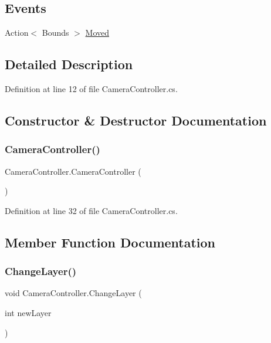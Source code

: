 \subsection*{Events}
\begin{DoxyCompactItemize}
\item 
Action$<$ Bounds $>$ \hyperlink{class_camera_controller_a660773a1d2a570dec85afc8f105bd523}{Moved}
\end{DoxyCompactItemize}


\subsection{Detailed Description}


Definition at line 12 of file Camera\+Controller.\+cs.



\subsection{Constructor \& Destructor Documentation}
\mbox{\label{class_camera_controller_a2028264f95bb29ae3a0fbd3255e3c401}} 
\subsubsection{\texorpdfstring{Camera\+Controller()}{CameraController()}}
{\footnotesize\ttfamily Camera\+Controller.\+Camera\+Controller (\begin{DoxyParamCaption}{ }\end{DoxyParamCaption})}



Definition at line 32 of file Camera\+Controller.\+cs.



\subsection{Member Function Documentation}
\mbox{\label{class_camera_controller_a490a2f66c60adedcb74d3b3cde07275d}} 
\subsubsection{\texorpdfstring{Change\+Layer()}{ChangeLayer()}}
{\footnotesize\ttfamily void Camera\+Controller.\+Change\+Layer (\begin{DoxyParamCaption}\item[{int}]{new\+Layer }\end{DoxyParamCaption})}



